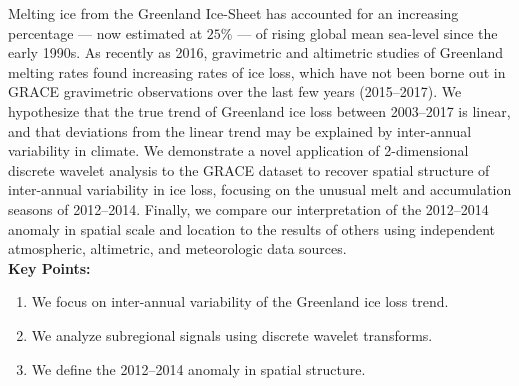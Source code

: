 

Melting ice from the Greenland Ice-Sheet has accounted for an increasing percentage --- now estimated at $25\%$ --- of rising global mean sea-level since the early 1990s. As recently as 2016, gravimetric and altimetric studies of Greenland melting rates found  increasing rates of ice loss, which have not been borne out in GRACE gravimetric observations over the last few years (2015--2017). We hypothesize that the true trend of Greenland ice loss between 2003--2017 is linear, and that deviations from the linear trend may be explained by inter-annual variability in climate. We demonstrate a novel application of 2-dimensional discrete wavelet analysis to the GRACE dataset to recover spatial structure of inter-annual variability in ice loss, focusing on the unusual melt and accumulation seasons of 2012--2014. Finally, we compare our interpretation of the 2012--2014 anomaly in spatial scale and location to the results of others using independent atmospheric, altimetric, and meteorologic data sources. \\[3em]

\textbf{Key Points:}
\begin{enumerate}
	\item We focus on inter-annual variability of the Greenland ice loss trend.
	\item We analyze subregional signals using discrete wavelet transforms.
	\item We define the 2012--2014 anomaly in spatial structure.

\end{enumerate}